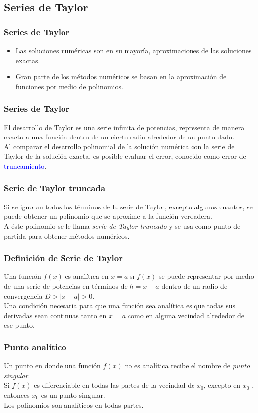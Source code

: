 \subsection{Series de Taylor}
\begin{frame}
\frametitle{Series de Taylor}
\begin{itemize}[<+->]
\item Las soluciones numéricas son en su mayoría, aproximaciones de las soluciones exactas.
\item Gran parte de los métodos numéricos se basan en la aproximación de funciones por medio de polinomios.
\end{itemize}
\end{frame}
\begin{frame}
\frametitle{Series de Taylor}
El desarrollo de Taylor es una serie infinita de potencias, representa de manera exacta a una función dentro de un cierto radio alrededor de un punto dado.
\\
\medskip
Al comparar el desarrollo polinomial de la solución numérica con la serie de Taylor de la solución exacta, es posible evaluar el error, conocido como error de \textcolor{blue}{truncamiento}.
\end{frame}
\begin{frame}
\frametitle{Serie de Taylor truncada}
Si se ignoran todos los términos de la serie de Taylor, excepto algunos cuantos, se puede obtener un polinomio que se aproxime a la función verdadera.
\\
\medskip
A éste polinomio se le llama \textit{serie de Taylor truncado} y se usa como punto de partida para obtener métodos numéricos.
\end{frame}
\begin{frame}
\frametitle{Definición de Serie de Taylor}
Una función $f(x)$ es analítica en $x=a$ si $f(x)$ se puede representar por medio de una serie de potencias en términos de $h = x-a$ dentro de un radio de convergencia $D > |x-a|> 0$.
\\
\bigskip
\pause
Una condición necesaria para que una función sea analítica es que todas sus derivadas sean continuas tanto en $x=a$ como en alguna vecindad alrededor de ese punto.
\end{frame}
\begin{frame}
\frametitle{Punto analítico}
Un punto en donde una función $f(x)$ no es analítica recibe el nombre de \emph{punto singular}. 
\\
\medskip
\pause
Si $f(x)$ es diferenciable en todas las partes de la vecindad de $x_{0}$, excepto en $x_{0}$ , entonces $x_{0}$ es un punto singular.
\\
\medskip
Los polinomios son analíticos en todas partes.
\end{frame}
